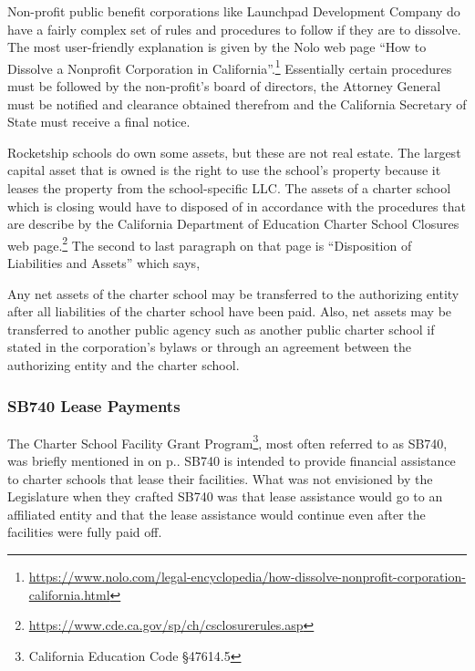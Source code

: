 Non-profit public benefit corporations like Launchpad Development Company do have a fairly complex set of rules and procedures to follow if they are to dissolve. The most user-friendly explanation is given by the Nolo web page ``How to Dissolve a Nonprofit Corporation in California''.\footnote{\url{https://www.nolo.com/legal-encyclopedia/how-dissolve-nonprofit-corporation-california.html}} Essentially certain procedures must be followed by the non-profit's board of directors, the Attorney General must be notified and clearance obtained therefrom and the California Secretary of State must receive a final notice.

Rocketship schools do own some assets, but these are not real estate. The largest capital asset that is owned is the right to use the school's property because it leases the property from the school-specific LLC. The assets of a charter school which is closing would have to disposed of in accordance with the procedures that are describe by the California Department of Education Charter School Closures web page.\footnote{\url{https://www.cde.ca.gov/sp/ch/csclosurerules.asp}} The second to last paragraph on that page is ``Disposition of Liabilities and Assets'' which says,
\begin{blockquote}%
{Any net assets of the charter school may be transferred to the authorizing entity after all liabilities of the charter school have been paid. Also, net assets may be transferred to another public agency such as another public charter school if stated in the corporation's bylaws or through an agreement between the authorizing entity and the charter school.}%
\end{blockquote}

\subsubsection{SB740 Lease Payments}%
\label{sec:sb740-lease-payments}\indent

The Charter School Facility Grant Program\footnote{California Education Code §47614.5}, most often referred to as SB740, was briefly mentioned in  on p.\pageref{sec:rent-subsidies}. SB740 is intended to provide financial assistance to charter schools that lease their facilities. What was not envisioned by the Legislature when they crafted SB740 was that lease assistance would go to an affiliated entity and that the lease assistance would continue even after the facilities were fully paid off.

